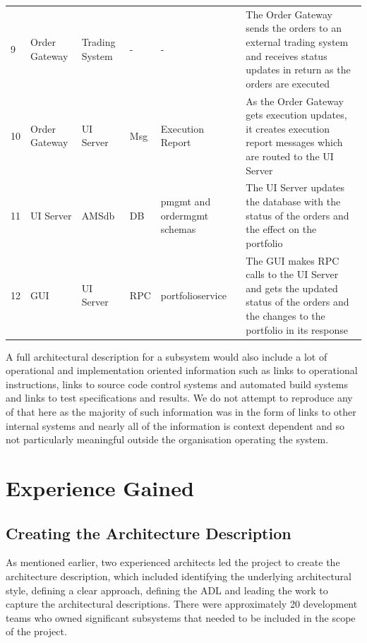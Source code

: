 \begin{table}
\begin{tabular}{l l l l p{2cm} p{5cm}}
9 & Order Gateway & Trading System & - & - & The Order Gateway sends the orders to an external trading system and receives status updates in return as the orders are executed \\

10 & Order Gateway & UI Server & Msg & Execution Report & As the Order Gateway gets execution updates, it creates execution report messages which are routed to the UI Server \\

11 & UI Server & AMSdb & DB & pmgmt and ordermgmt schemas & The UI Server updates the database with the status of the orders and the effect on the portfolio \\

12 & GUI & UI Server & RPC & portfolioservice & The GUI makes RPC calls to the UI Server and gets the updated status of the orders and the changes to the portfolio in its response \\

\end{tabular}
\end{table}

  A full architectural description for a subsystem would also include a lot of operational and implementation oriented information such as links to operational instructions, links to source code control systems and automated build systems and links to test specifications and results.  We do not attempt to reproduce any of that here as the majority of such information was in the form of links to other internal systems and nearly all of the information is context dependent and so not particularly meaningful outside the organisation operating the system.

\section{Experience Gained}

\subsection{Creating the Architecture Description}

  As mentioned earlier, two experienced architects led the project to create the architecture description, which included identifying the underlying architectural style, defining a clear approach, defining the ADL and leading the work to capture the architectural descriptions.  There were approximately 20 development teams who owned significant subsystems that needed to be included in the scope of the project.

